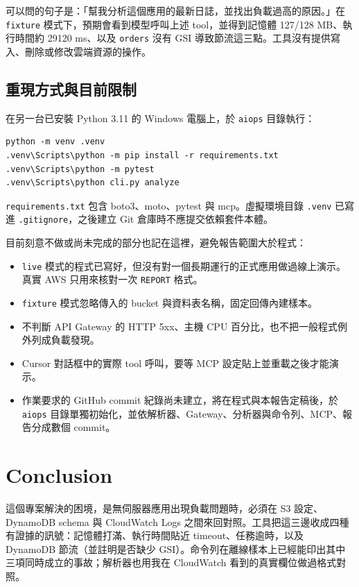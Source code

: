 \documentclass[11pt]{article}
\begin{document}
可以問的句子是：「幫我分析這個應用的最新日誌，並找出負載過高的原因。」在 \texttt{fixture} 模式下，預期會看到模型呼叫上述 tool，並得到記憶體 127/128 MB、執行時間約 29120 ms、以及 \texttt{orders} 沒有 GSI 導致節流這三點。工具沒有提供寫入、刪除或修改雲端資源的操作。

\subsection{重現方式與目前限制}

在另一台已安裝 Python 3.11 的 Windows 電腦上，於 \texttt{aiops} 目錄執行：

\begin{verbatim}
python -m venv .venv
.venv\Scripts\python -m pip install -r requirements.txt
.venv\Scripts\python -m pytest
.venv\Scripts\python cli.py analyze
\end{verbatim}

\texttt{requirements.txt} 包含 boto3、moto、pytest 與 mcp。虛擬環境目錄 \texttt{.venv} 已寫進 \texttt{.gitignore}，之後建立 Git 倉庫時不應提交依賴套件本體。

目前刻意不做或尚未完成的部分也記在這裡，避免報告範圍大於程式：

\begin{itemize}
    \item \texttt{live} 模式的程式已寫好，但沒有對一個長期運行的正式應用做過線上演示。真實 AWS 只用來核對一次 \texttt{REPORT} 格式。
    \item \texttt{fixture} 模式忽略傳入的 bucket 與資料表名稱，固定回傳內建樣本。
    \item 不判斷 API Gateway 的 HTTP 5xx、主機 CPU 百分比，也不把一般程式例外列成負載發現。
    \item Cursor 對話框中的實際 tool 呼叫，要等 MCP 設定貼上並重載之後才能演示。
    \item 作業要求的 GitHub commit 紀錄尚未建立，將在程式與本報告定稿後，於 \texttt{aiops} 目錄單獨初始化，並依解析器、Gateway、分析器與命令列、MCP、報告分成數個 commit。
\end{itemize}

\section{Conclusion}

這個專案解決的困境，是無伺服器應用出現負載問題時，必須在 S3 設定、DynamoDB schema 與 CloudWatch Logs 之間來回對照。工具把這三邊收成四種有證據的訊號：記憶體打滿、執行時間貼近 timeout、任務逾時，以及 DynamoDB 節流（並註明是否缺少 GSI）。命令列在離線樣本上已經能印出其中三項同時成立的事故；解析器也用我在 CloudWatch 看到的真實欄位做過格式對照。
\end{document}
